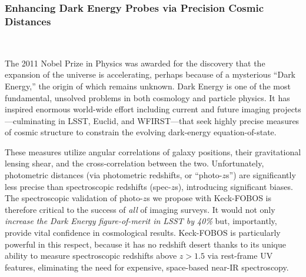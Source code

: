 \documentclass[oneside,11pt]{amsart}
\newcommand{\comment}[2][todo]{{\color{#1}[[{\bf #2}]]}}
\begin{document}

\subsubsection{Enhancing Dark Energy Probes via Precision Cosmic Distances}
\label{sec:cosmology}
~\medskip

The 2011 Nobel Prize in Physics was awarded for the discovery that the expansion of the universe is accelerating,
perhaps because of a mysterious ``Dark Energy,'' the origin of which remains unknown.  Dark Energy is one of the most
fundamental, unsolved problems in both cosmology and particle physics.  It has inspired enormous world-wide effort
including current and future imaging projects---culminating in LSST, Euclid, and WFIRST---that seek highly precise
measures of cosmic structure to constrain the evolving dark-energy equation-of-state.

These measures utilize angular correlations of galaxy positions, their gravitational lensing shear, and the
cross-correlation between the two.  Unfortunately, photometric distances (via photometric redshifts, or ``photo-$z$s'')
are significantly less precise than spectroscopic redshifts (spec-$z$s), introducing significant biases.  The
spectroscopic validation of photo-$z$s we propose with Keck-FOBOS is therefore critical to the success of {\it all} of
imaging surveys. It would not only \emph{increase the Dark Energy figure-of-merit in LSST by 40\%} \citep{newman15}
but, importantly, provide vital confidence in cosmological results. Keck-FOBOS is particularly powerful in this
respect, because it has no redshift desert thanks to its unique ability to measure spectroscopic redshifts
above $z > 1.5$ via rest-frame UV features, eliminating the need for expensive, space-based near-IR spectroscopy.
\end{document}
